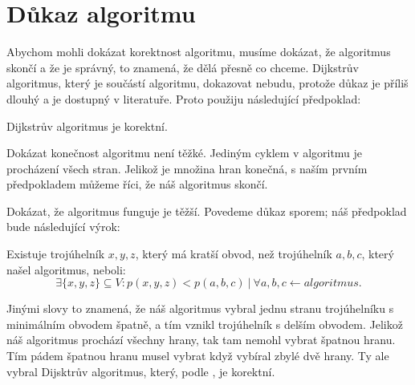 \section{Důkaz algoritmu}
\label{dukaz_algoritmu}

Abychom mohli dokázat korektnost algoritmu, musíme dokázat, že algoritmus skončí a že je správný, to znamená, že dělá přesně co chceme. Dijkstrův algoritmus, který je součástí algoritmu, dokazovat nebudu, protože důkaz je příliš dlouhý a je dostupný v literatuře. Proto použiju následující předpoklad:
\begin{vyrok}[Předpoklad]
    \label{vyrok:dijkstra}
    Dijkstrův algoritmus je korektní.
\end{vyrok}

Dokázat konečnost algoritmu není těžké. Jediným cyklem v algoritmu je procházení všech stran. Jelikož je množina hran konečná, s naším prvním předpokladem můžeme říci, že náš algoritmus skončí.

Dokázat, že algoritmus funguje je těžší. Povedeme důkaz sporem; náš předpoklad bude následující výrok:

\begin{vyrok}[Předpoklad]
    \label{vyrok:trojuhelnik}
Existuje trojúhelník $x, y, z$, který má kratší obvod, než trojúhelník $a, b, c$, který našel algoritmus, neboli:
\begin{equation*}
    \exists \{x, y, z\}\subseteq V: p(x, y, z) < p(a, b, c)~|~\forall a, b, c \leftarrow algoritmus.
\end{equation*}
\end{vyrok}
Jinými slovy to znamená, že náš algoritmus vybral jednu stranu trojúhelníku s minimálním obvodem špatně, a tím vznikl trojúhelník s delším obvodem. Jelikož náš algoritmus prochází všechny hrany, tak tam nemohl vybrat špatnou hranu. Tím pádem špatnou hranu musel vybrat když vybíral zbylé dvě hrany. Ty ale vybral Dijsktrův algoritmus, který, podle , je korektní.
